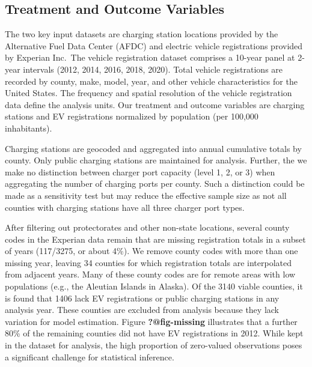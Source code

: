 \documentclass[
  letterpaper,
  DIV=11,
  numbers=noendperiod]{scrartcl}
\begin{document}
\hypertarget{treatment-and-outcome-variables}{%
\subsection{Treatment and Outcome
Variables}\label{treatment-and-outcome-variables}}

The two key input datasets are charging station locations provided by
the Alternative Fuel Data Center (AFDC) and electric vehicle
registrations provided by Experian Inc.~The vehicle registration dataset
comprises a 10-year panel at 2-year intervals (2012, 2014, 2016, 2018,
2020). Total vehicle registrations are recorded by county, make, model,
year, and other vehicle characteristics for the United States. The
frequency and spatial resolution of the vehicle registration data define
the analysis units. Our treatment and outcome variables are charging
stations and EV registrations normalized by population (per 100,000
inhabitants).

Charging stations are geocoded and aggregated into annual cumulative
totals by county. Only public charging stations are maintained for
analysis. Further, the we make no distinction between charger port
capacity (level 1, 2, or 3) when aggregating the number of charging
ports per county. Such a distinction could be made as a sensitivity test
but may reduce the effective sample size as not all counties with
charging stations have all three charger port types.

After filtering out protectorates and other non-state locations, several
county codes in the Experian data remain that are missing registration
totals in a subset of years (117/3275, or about 4\%). We remove county
codes with more than one missing year, leaving 34 counties for which
registration totals are interpolated from adjacent years. Many of these
county codes are for remote areas with low populations (e.g., the
Aleutian Islands in Alaska). Of the 3140 viable counties, it is found
that 1406 lack EV registrations or public charging stations in any
analysis year. These counties are excluded from analysis because they
lack variation for model estimation. Figure \textbf{?@fig-missing}
illustrates that a further 80\% of the remaining counties did not have
EV registrations in 2012. While kept in the dataset for analysis, the
high proportion of zero-valued observations poses a significant
challenge for statistical inference.
\end{document}
